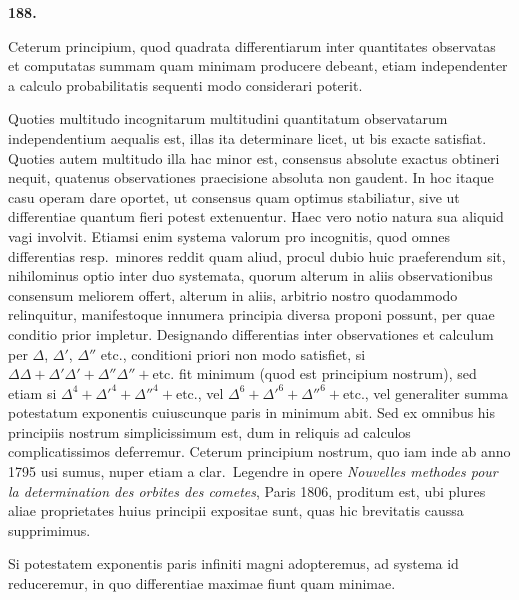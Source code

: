 \documentclass[11pt,a4paper]{article}
\begin{document}
\newpage
\setcounter{page}{259}

\noindent\textbf{188.}

Ceterum principium, quod quadrata differentiarum inter quantitates observatas et computatas summam quam minimam producere debeant, etiam independenter a calculo probabilitatis sequenti modo considerari poterit.

Quoties multitudo incognitarum multitudini quantitatum observatarum independentium aequalis est, illas ita determinare licet, ut bis exacte satisfiat. Quoties autem multitudo illa hac minor est, consensus absolute exactus obtineri nequit, quatenus observationes praecisione absoluta non gaudent. In hoc itaque casu operam dare oportet, ut consensus quam optimus stabiliatur, sive ut differentiae quantum fieri potest extenuentur. Haec vero notio natura sua aliquid vagi involvit. Etiamsi enim systema valorum pro incognitis, quod omnes differentias resp.\ minores reddit quam aliud, procul dubio huic praeferendum sit, nihilominus optio inter duo systemata, quorum alterum in aliis observationibus consensum meliorem offert, alterum in aliis, arbitrio nostro quodammodo relinquitur, manifestoque innumera principia diversa proponi possunt, per quae conditio prior impletur. Designando differentias inter observationes et calculum per $\Delta$, $\Delta'$, $\Delta''$ etc., conditioni priori non modo satisfiet, si $\Delta\Delta + \Delta'\Delta' + \Delta''\Delta'' + \text{etc.}$ fit minimum (quod est principium nostrum), sed etiam si $\Delta^4 + \Delta'^4 + \Delta''^4 + \text{etc.}$, vel $\Delta^6 + \Delta'^6 + \Delta''^6 + \text{etc.}$, vel generaliter summa potestatum exponentis cuiuscunque paris in minimum abit. Sed ex omnibus his principiis nostrum simplicissimum est, dum in reliquis ad calculos complicatissimos deferremur. Ceterum principium nostrum, quo iam inde ab anno 1795 usi sumus, nuper etiam a clar.\ Legendre in opere \textit{Nouvelles methodes pour la determination des orbites des cometes}, Paris 1806, proditum est, ubi plures aliae proprietates huius principii expositae sunt, quas hic brevitatis caussa supprimimus.

Si potestatem exponentis paris infiniti magni adopteremus, ad systema id reduceremur, in quo differentiae maximae fiunt quam minimae.
\end{document}
